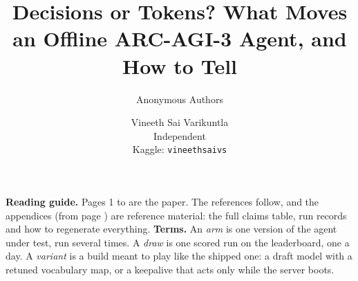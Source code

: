 \documentclass{article}
\author{Anonymous Authors}
\author{Vineeth Sai Varikuntla \\ Independent \\ Kaggle: \texttt{vineethsaivs}}
\title{Decisions or Tokens? What Moves an Offline ARC-AGI-3 Agent, and How to Tell}
\newcommand{\notebox}[1]{\par\smallskip\noindent\colorbox{boxgray}{\parbox{\dimexpr\linewidth-2\fboxsep\relax}{\small #1}}\par\smallskip}
\begin{document}
\maketitle

\begin{abstract}

\end{abstract}

\notebox{\textbf{Reading guide.} Pages 1 to \pageref{pg:bodyend} are the paper. The references follow, and the appendices (from page \pageref{pg:appstart}) are reference material: the full claims table, run records and how to regenerate everything.
\textbf{Terms.} An \emph{arm} is one version of the agent under test, run several times. A \emph{draw} is one scored run on the leaderboard, one a day. A \emph{variant} is a build meant to play like the shipped one: a draft model with a retuned vocabulary map, or a keepalive that acts only while the server boots.}











\label{pg:bodyend}

\clearpage



\clearpage
\appendix
{}\label{pg:appstart}
\FloatBarrier
\FloatBarrier
\FloatBarrier
\FloatBarrier
\FloatBarrier
\FloatBarrier
\FloatBarrier
\FloatBarrier
\FloatBarrier
\FloatBarrier
\FloatBarrier
\FloatBarrier
\FloatBarrier

\end{document}
